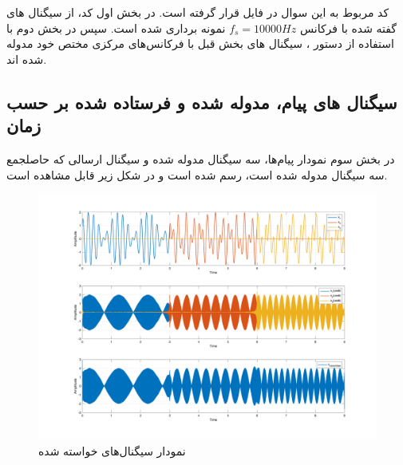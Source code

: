 \documentclass[10pt]{article}
\begin{document}
\section{}
کد مربوط به این سوال در فایل 
قرار گرفته است. در بخش اول کد، از سیگنال های گفته شده با فرکانس 
$f_s = 10000Hz$
نمونه برداری شده است. سپس در بخش دوم با استفاده از دستور 
،
سیگنال های بخش قبل با فرکانس‌های مرکزی مختص خود مدوله شده اند. 
\subsection*{سیگنال های پیام، مدوله شده و فرستاده شده بر حسب زمان}
در بخش سوم نمودار پیام‌ها، سه سیگنال مدوله شده و سیگنال ارسالی که حاصلجمع سه سیگنال مدوله شده است، رسم شده است و در شکل زیر قابل مشاهده است.
\begin{figure}[h]
	\centering
	\includegraphics[width=0.95\linewidth]{../pics/q2-1}
	\caption{نمودار سیگنال‌های خواسته شده}
	\label{fig:q2-1}
\end{figure}

\newpage
\end{document}
